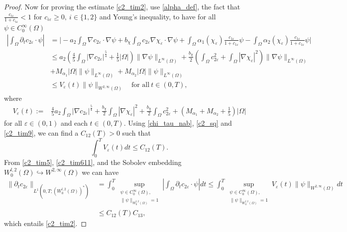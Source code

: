\documentclass[a4paper,10pt]{article}
\theoremstyle{definition}
\begin{document}
\begin{proof}
\noindent
Now for proving the estimate \eqref{c2_tim2}, use \eqref{alpha_def}, the fact that $\frac{c_{i\varepsilon}}{1 + c_{i\varepsilon}} < 1$ for $c_{i\varepsilon} \geq 0,\ i \in \{1, 2\}$ and Young's inequality, to have for all $\psi \in C_0^\infty(\Omega)$
  \begin{align}
  \label{c2_tim5}
    \nonumber \left|\int_\Omega \partial_t c_{2\varepsilon} \cdot \psi\right| & = \bigg| - a_2 \int_\Omega \nabla c_{2\varepsilon} \cdot \nabla \psi + b_\chi \int_\Omega c_{2\varepsilon} \nabla \chi_\varepsilon \cdot \nabla \psi  + \int_\Omega \alpha_1(\chi_\varepsilon)\tfrac{c_{1\varepsilon}}{1 + c_{1\varepsilon}}  \psi - \int_\Omega \alpha_2(\chi_\varepsilon)\tfrac{c_{1\varepsilon}}{1 + c_{1\varepsilon}} \psi  \bigg| \\[5pt]
    \nonumber & \leq a_2 \left(\frac{4}{5} \int_\Omega |\nabla c_{2\varepsilon}|^{\frac{5}{4}} + \frac{1}{5} |\Omega|\right)\|\nabla \psi\|_{L^\infty(\Omega)} + \frac{b_\chi}{2} \left(\int_\Omega c_{2\varepsilon}^2 + \int_\Omega |\nabla \chi_\varepsilon|^2\right)\|\nabla \psi\|_{L^\infty(\Omega)} \\[5pt]
    \nonumber & + M_{\alpha_1} |\Omega| \| \psi\|_{L^\infty(\Omega)} +  M_{\alpha_2}  |\Omega| \| \psi\|_{L^\infty(\Omega)}\\[5pt]
    & \leq V_\varepsilon(t) \|\psi\|_{W^{2, \infty}(\Omega)} \quad \text{for all} ~ t \in (0, T),
  \end{align}
   where
  \begin{align*}
    V_\varepsilon(t) := & \frac{4}{5} a_2 \int_\Omega |\nabla c_{2\varepsilon}|^{\frac{5}{4}} + \frac{b_\chi}{2} \int_\Omega |\nabla \chi_\varepsilon|^2 + \frac{b_\chi}{2} \int_\Omega c_{2\varepsilon}^2 + (M_{\alpha_1} + M_{\alpha_2} + \tfrac{1}{5})|\Omega|
  \end{align*}
for all $\varepsilon \in (0, 1)$ and each $t \in (0, T)$. Using \eqref{chi_tau_nab}, \eqref{c2_sq} and \eqref{c2_tim9}, we can find a $C_{12}(T) > 0$ such that
\begin{equation}
 \label{c2_tim611}
  \int_0^T V_\varepsilon(t) dt \leq C_{12}(T).
\end{equation}
From \eqref{c2_tim5}, \eqref{c2_tim611}, and the Sobolev embedding $W_0^{l, 2}(\Omega) \hookrightarrow W^{2, \infty}(\Omega)$ we can have
\begin{align*}
   \|\partial_t c_{2\varepsilon}\|_{L^1(0, T; (W_0^{l, 2}(\Omega))^\ast)} & = \int_0^T \sup_{\substack{\psi \in C_0^\infty(\Omega),\\ \|\psi\|_{W^{l, 2}_0(\Omega)} = 1}} \left|\int_\Omega \partial_t c_{2\varepsilon} \cdot \psi \right| dt  \leq \int_0^T \sup_{\substack{\psi \in C_0^\infty(\Omega),\\ \|\psi\|_{W^{l, 2}_0(\Omega)} = 1}} V_\varepsilon(t) \|\psi\|_{W^{2, \infty}(\Omega)} dt  \\[5pt]
   & \leq C_{12}(T) C_{13},
  \end{align*}
which entails \eqref{c2_tim2}.
\end{proof}
\end{document}
